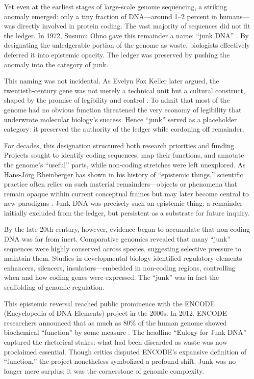 \documentclass[12pt]{article}
\begin{document}
{{{Yet even at the earliest stages of large-scale genome sequencing, a striking anomaly emerged: only a tiny fraction of DNA---around 1--2 percent in humans---was directly involved in protein coding. The vast majority of sequences did not fit the ledger. In 1972, Susumu Ohno gave this remainder a name: ``junk DNA'' \citep{ohno1972}. By designating the unledgerable portion of the genome as waste, biologists effectively deferred it into epistemic opacity. The ledger was preserved by pushing the anomaly into the category of junk.

This naming was not incidental. As Evelyn Fox Keller later argued, the twentieth-century gene was not merely a technical unit but a cultural construct, shaped by the promise of legibility and control \citep{keller2000}. To admit that most of the genome had no obvious function threatened the very economy of legibility that underwrote molecular biology’s success. Hence ``junk'' served as a placeholder category: it preserved the authority of the ledger while cordoning off remainder.

For decades, this designation structured both research priorities and funding. Projects sought to identify coding sequences, map their functions, and annotate the genome’s ``useful'' parts, while non-coding stretches were left unexplored. As Hans-Jörg Rheinberger has shown in his history of ``epistemic things,'' scientific practice often relies on such material remainders---objects or phenomena that remain opaque within current conceptual frames but may later become central to new paradigms \citep{rheinberger1997}. Junk DNA was precisely such an epistemic thing: a remainder initially excluded from the ledger, but persistent as a substrate for future inquiry.

By the late 20th century, however, evidence began to accumulate that non-coding DNA was far from inert. Comparative genomics revealed that many ``junk'' sequences were highly conserved across species, suggesting selective pressure to maintain them. Studies in developmental biology identified regulatory elements---enhancers, silencers, insulators---embedded in non-coding regions, controlling when and how coding genes were expressed. The ``junk'' was in fact the scaffolding of genomic regulation.

This epistemic reversal reached public prominence with the ENCODE (Encyclopedia of DNA Elements) project in the 2000s. In 2012, ENCODE researchers announced that as much as 80\% of the human genome showed biochemical ``function'' by some measure \citep{encode2012, pennisi2012}. The headline ``Eulogy for Junk DNA'' captured the rhetorical stakes: what had been discarded as waste was now proclaimed essential. Though critics disputed ENCODE’s expansive definition of ``function,'' the project nonetheless symbolized a profound shift. Junk was no longer mere surplus; it was the cornerstone of genomic complexity.

}}}
\end{document}
